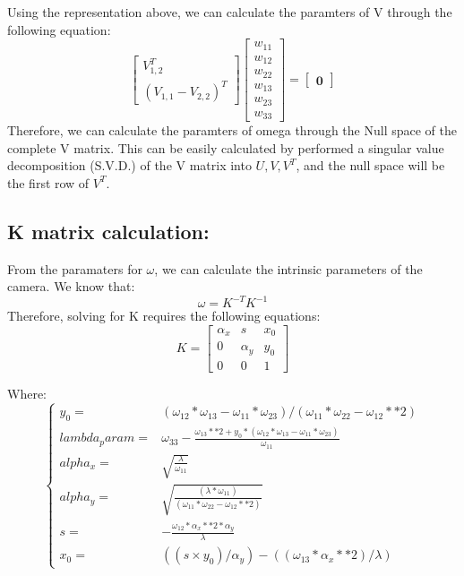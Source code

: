 \documentclass{article}
\begin{document}
Using the representation above, we can calculate the paramters of V through the following equation:
\[\begin{bmatrix}
    V_{1, 2}^T \\
    (V_{1, 1} - V_{2, 2})^T
\end{bmatrix}
\begin{bmatrix}
    w_{11} \\
    w_{12} \\
    w_{22} \\
    w_{13} \\
    w_{23} \\
    w_{33}
\end{bmatrix} = \begin{bmatrix}
    \boldsymbol{0}
\end{bmatrix}\]
Therefore, we can calculate the paramters of omega through the Null space of the complete V matrix. This can be easily calculated by performed a singular value decomposition (S.V.D.) of the V matrix into $U, V, V^T$, and the null space will be the first row of $V^T$.

\subsection{K matrix calculation:}
From the paramaters for $\omega$, we can calculate the intrinsic parameters of the camera. We know that: 
\[\omega = K^{-T}K^{-1}\]
Therefore, solving for K requires the following equations:
\[K = \begin{bmatrix}
    \alpha_x & s & x_0 \\
    0 & \alpha_y & y_0 \\
    0 & 0 & 1
\end{bmatrix}\]

Where:
\[\begin{cases}  
    y_0 = & (\omega_12*\omega_13 - \omega_11*\omega_23) / (\omega_11*\omega_22 - \omega_12**2) \\[10pt]
    lambda_param = & \omega_33 - \frac{\omega_13**2 + y_0*(\omega_12*\omega_13 - \omega_11*\omega_23)}{\omega_11} \\[10pt]
    alpha_x = & \sqrt{\frac{\lambda}{\omega_11}} \\[10pt]
    alpha_y = & \sqrt{\frac{\left(\lambda *\omega_11\right)}{\left(\omega_11*\omega_22 - \omega_12**2\right)}} \\[10pt]
    s = & -\frac{\omega_12 * \alpha_x**2 * \alpha_y}{\lambda} \\[10pt]
    x_0 = & ((s \times y_0)/\alpha_y) - ((\omega_13 * \alpha_x**2)/\lambda)
\end{cases}\]
\end{document}
